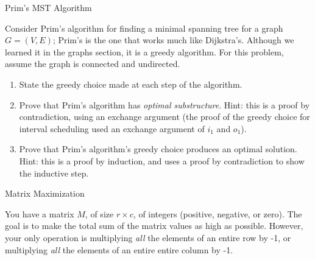\documentclass[10pt]{article}
\begin{document}
\thispagestyle{empty}
\handout



\begin{problem} Prim's MST Algorithm \end{problem}

Consider Prim's algorithm for finding a minimal spanning tree for a graph $G=(V,E)$; Prim's is the one that works much like Dijkstra's.  Although we learned it in the graphs section, it is a greedy algorithm.  For this problem, assume the graph is connected and undirected.

\begin{enumerate}

\item State the greedy choice made at each step of the algorithm.

\solution{

}

\item Prove that Prim's algorithm has {\em optimal substructure}.  Hint: this is a proof by contradiction, using an exchange argument (the proof of the greedy choice for interval scheduling used an exchange argument of $i_1$ and $o_1$).

\solution{

}

\item Prove that Prim's algorithm's greedy choice produces an optimal solution.  Hint: this is a proof by induction, and uses a proof by contradiction to show the inductive step.

\solution{

}

\end{enumerate}




\begin{problem} Matrix Maximization \end{problem}

You have a matrix $M$, of size $r \times c$, of integers (positive, negative, or zero).  The goal is to make the total sum of the matrix values as high as possible. However, your only operation is multiplying {\em all} the elements of an entire row by -1, or multiplying {\em all} the elements of an entire entire column by -1. 
\end{document}
